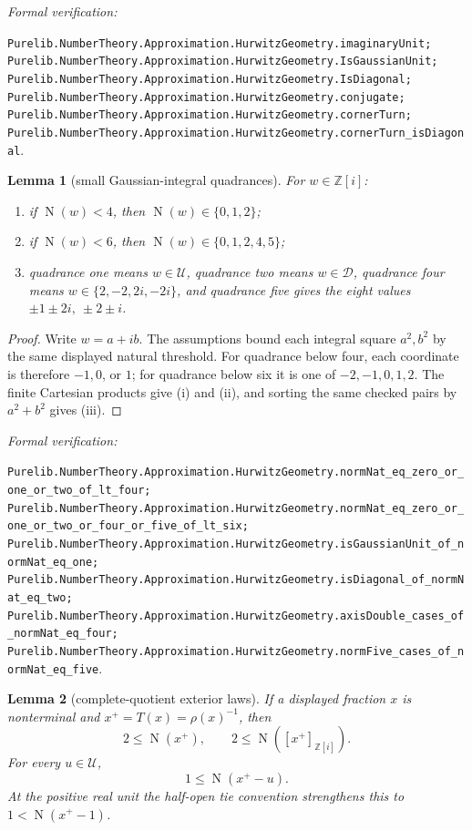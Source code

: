 \documentclass[11pt]{article}
\newtheorem{lemma}[lemma]{Lemma}
\newcommand{\Zi}{\mathbb{Z}[i]}
\newcommand{\Norm}[1]{\operatorname{N}\!\left(#1\right)}
\newcommand{\leanref}[1]{\par\smallskip\noindent
  \emph{Formal verification:}\par\nobreak
  {\raggedright\nolinkurl{#1}.\par}}
\begin{document}
\leanref{Purelib.NumberTheory.Approximation.HurwitzGeometry.imaginaryUnit;
Purelib.NumberTheory.Approximation.HurwitzGeometry.IsGaussianUnit;
Purelib.NumberTheory.Approximation.HurwitzGeometry.IsDiagonal;
Purelib.NumberTheory.Approximation.HurwitzGeometry.conjugate;
Purelib.NumberTheory.Approximation.HurwitzGeometry.cornerTurn;
Purelib.NumberTheory.Approximation.HurwitzGeometry.cornerTurn_isDiagonal}

\begin{lemma}[small Gaussian-integral quadrances]
\label{lem:small-gaussian-quadrances}
For $w\in\Zi$:
\begin{enumerate}[label=(\roman*)]
\item if $\Norm w<4$, then $\Norm w\in\{0,1,2\}$;
\item if $\Norm w<6$, then $\Norm w\in\{0,1,2,4,5\}$;
\item quadrance one means $w\in\mathcal U$, quadrance two means
$w\in\mathcal D$, quadrance four means $w\in\{2,-2,2i,-2i\}$, and
quadrance five gives the eight values $\pm1\pm2i,\ \pm2\pm i$.
\end{enumerate}
\end{lemma}

\begin{proof}
Write $w=a+ib$.  The assumptions bound each integral square $a^2,b^2$ by
the same displayed natural threshold.  For quadrance below four, each
coordinate is therefore $-1,0$, or $1$; for quadrance below six it is one of
$-2,-1,0,1,2$.  The finite Cartesian products give (i) and (ii), and sorting
the same checked pairs by $a^2+b^2$ gives (iii).
\end{proof}

\leanref{Purelib.NumberTheory.Approximation.HurwitzGeometry.normNat_eq_zero_or_one_or_two_of_lt_four;
Purelib.NumberTheory.Approximation.HurwitzGeometry.normNat_eq_zero_or_one_or_two_or_four_or_five_of_lt_six;
Purelib.NumberTheory.Approximation.HurwitzGeometry.isGaussianUnit_of_normNat_eq_one;
Purelib.NumberTheory.Approximation.HurwitzGeometry.isDiagonal_of_normNat_eq_two;
Purelib.NumberTheory.Approximation.HurwitzGeometry.axisDouble_cases_of_normNat_eq_four;
Purelib.NumberTheory.Approximation.HurwitzGeometry.normFive_cases_of_normNat_eq_five}

\begin{lemma}[complete-quotient exterior laws]
\label{lem:complete-quotient-exterior}
If a displayed fraction $x$ is nonterminal and $x^+=T(x)=\rho(x)^{-1}$,
then
\begin{equation}
\label{eq:complete-quotient-size}
                     2\le\Norm{x^+},
 \qquad
                     2\le\Norm{[x^+]_{\Zi}}.
\end{equation}
For every $u\in\mathcal U$,
\begin{equation}
\label{eq:unit-exterior}
                       1\le\Norm{x^+-u}.
\end{equation}
At the positive real unit the half-open tie convention strengthens this to
$1<\Norm{x^+-1}$.
\end{lemma}
\end{document}
